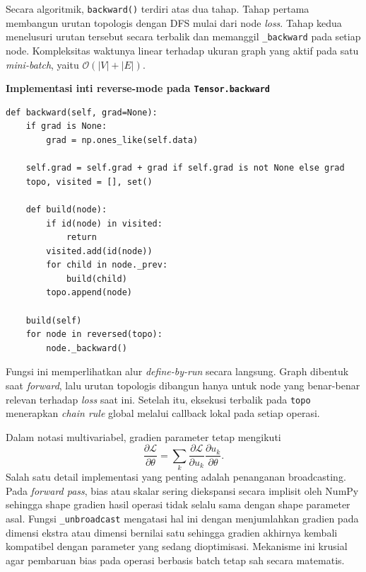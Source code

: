\documentclass{article}
\begin{document}
Secara algoritmik, \texttt{backward()} terdiri atas dua tahap. Tahap pertama membangun urutan topologis dengan DFS mulai dari node \textit{loss}. Tahap kedua menelusuri urutan tersebut secara terbalik dan memanggil \texttt{\_backward} pada setiap node. Kompleksitas waktunya linear terhadap ukuran graph yang aktif pada satu \textit{mini-batch}, yaitu $\mathcal{O}(|V|+|E|)$.

\noindent\textbf{Implementasi inti reverse-mode pada \texttt{Tensor.backward}}\par
\begin{lstlisting}
def backward(self, grad=None):
    if grad is None:
        grad = np.ones_like(self.data)

    self.grad = self.grad + grad if self.grad is not None else grad
    topo, visited = [], set()

    def build(node):
        if id(node) in visited:
            return
        visited.add(id(node))
        for child in node._prev:
            build(child)
        topo.append(node)

    build(self)
    for node in reversed(topo):
        node._backward()
\end{lstlisting}
Fungsi ini memperlihatkan alur \textit{define-by-run} secara langsung. Graph dibentuk saat \textit{forward}, lalu urutan topologis dibangun hanya untuk node yang benar-benar relevan terhadap \textit{loss} saat ini. Setelah itu, eksekusi terbalik pada \texttt{topo} menerapkan \textit{chain rule} global melalui callback lokal pada setiap operasi.

\begin{algorithm}[htbp]
\caption{Reverse-mode autodiff untuk \texttt{Tensor.backward}}
\end{algorithm}

Dalam notasi multivariabel, gradien parameter tetap mengikuti
\begin{equation}
\frac{\partial \mathcal{L}}{\partial \theta}
=
\sum_k
\frac{\partial \mathcal{L}}{\partial u_k}
\frac{\partial u_k}{\partial \theta}.
\end{equation}
Salah satu detail implementasi yang penting adalah penanganan broadcasting. Pada \textit{forward pass}, bias atau skalar sering diekspansi secara implisit oleh NumPy sehingga shape gradien hasil operasi tidak selalu sama dengan shape parameter asal. Fungsi \texttt{\_unbroadcast} mengatasi hal ini dengan menjumlahkan gradien pada dimensi ekstra atau dimensi bernilai satu sehingga gradien akhirnya kembali kompatibel dengan parameter yang sedang dioptimisasi. Mekanisme ini krusial agar pembaruan bias pada operasi berbasis batch tetap sah secara matematis.
\end{document}
